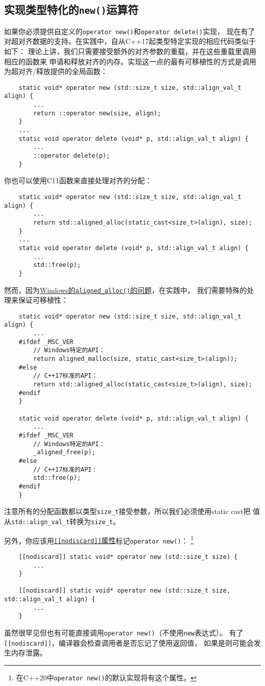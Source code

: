 \subsection{实现类型特化的\texttt{new()}运算符}\label{ch30.2.2}
如果你必须提供自定义的\texttt{operator new()}和\texttt{operator delete()}实现，
现在有了对超对齐数据的支持。在实践中，自从C++17起类型特定实现的相应代码类似于如下：
理论上讲，我们只需要接受额外的对齐参数的重载，并在这些重载里调用相应的函数来
申请和释放对齐的内存。实现这一点的最有可移植性的方式是调用为超对齐/释放提供的全局函数：
\begin{lstlisting}
    static void* operator new (std::size_t size, std::align_val_t align) {
        ...
        return ::operator new(size, align);
    }
    ...
    static void operator delete (void* p, std::align_val_t align) {
        ...
        ::operator delete(p);
    }
\end{lstlisting}
你也可以使用C11函数来直接处理对齐的分配：
\begin{lstlisting}
    static void* operator new (std::size_t size, std::align_val_t align) {
        ...
        return std::aligned_alloc(static_cast<size_t>(align), size);
    }
    ...
    static void operator delete (void* p, std::align_val_t align) {
        ...
        std::free(p);
    }
\end{lstlisting}
然而，因为\hyperref[ch30.1.1]{Windows的\texttt{aligned\_alloc()}的问题}，在实践中，
我们需要特殊的处理来保证可移植性：
\begin{lstlisting}
    static void* operator new (std::size_t size, std::align_val_t align) {
        ...
    #ifdef _MSC_VER
        // Windows特定的API：
        return aligned_malloc(size, static_cast<size_t>(align));
    #else
        // C++17标准的API：
        return std::aligned_alloc(static_cast<size_t>(align), size);
    #endif
    }

    static void operator delete (void* p, std::align_val_t align) {
        ...
    #ifdef _MSC_VER
        // Windows特定的API：
        _aligned_free(p);
    #else
        // C++17标准的API：
        std::free(p);
    #endif
    }
\end{lstlisting}
注意所有的分配函数都以类型\texttt{size\_t}接受参数，所以我们必须使用static cast把
值从\texttt{std::align\_val\_t}转换为\texttt{size\_t}。

另外，你应该用\hyperref[ch7.1]{\texttt{[[nodiscard]]}属性}标记\texttt{operator new()}：
\footnote{在C++20中\texttt{operator new()}的默认实现将有这个属性。}
\begin{lstlisting}
    [[nodiscard]] static void* operator new (std::size_t size) {
        ...
    }

    [[nodiscard]] static void* operator new (std::size_t size, std::align_val_t align) {
        ...
    }
\end{lstlisting}
虽然很罕见但也有可能直接调用\texttt{operator new()}（不使用\texttt{new}表达式）。
有了\texttt{[[nodiscard]]}，编译器会检查调用者是否忘记了使用返回值，
如果是则可能会发生内存泄露。

